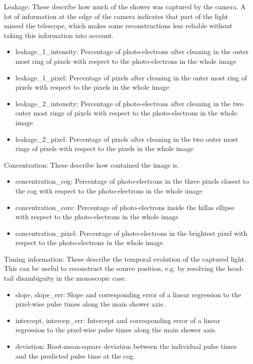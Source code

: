 Leakage:
These describe how much of the shower was captured by the camera.
A lot of information at the edge of the camera indicates that part of the light missed the telescope, 
which makes some reconstructions less reliable without taking this information into account.
\begin{itemize}
    \item{leakage_1_intensity: Percentage of photo-electrons after cleaning in the outer most ring of pixels with respect to the photo-electrons in the whole image}
    \item{leakage_1_pixel: Percentage of pixels after cleaning in the outer most ring of pixels with respect to the pixels in the whole image}
    \item{leakage_2_intensity: Percentage of photo-electrons after cleaning in the two outer most rings of pixels with respect to the photo-electrons in the whole image}
    \item{leakage_2_pixel: Percentage of pixels after cleaning in the two outer most rings of pixels with respect to the pixels in the whole image}
\end{itemize}

Concentration:
These describe how contained the image is.
\begin{itemize}
    \item{concentration_cog: Percentage of photo-electrons in the three pixels closest to the cog with respect to the photo-electrons in the whole image}
    \item{concentration_core: Percentage of photo-electrons inside the hillas ellipse with respect to the photo-electrons in the whole image}
    \item{concentration_pixel: Percentage of photo-electrons in the brightest pixel with respect to the photo-electrons in the whole image}
\end{itemize}

Timing information:
These describe the temporal evolution of the captured light.
This can be useful to reconstruct the source position, e.g. by resolving the head-tail disambiguity in the monoscopic case.
\begin{itemize}
    \item{slope, slope_err: Slope and corresponding  error of a linear regression to the pixel-wise pulse times along the main shower axis.}
    \item{intercept, intercep_err: Intercept and corresponding  error of a linear regression to the pixel-wise pulse times along the main shower axis.}
    \item{deviation: Root-mean-square deviation between the individual pulse times and the predicted pulse time at the cog.}
\end{itemize}

